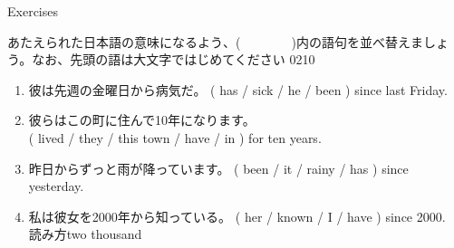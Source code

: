 \documentclass[aspectratio=169,xcolor={dvipsnames,table}]{beamer}
\newcommand{\myaudio}[1]{\href{#1}{\faVolumeUp}}
\begin{document}
\begin{frame}[plain]{Exercises}

{\small あたえられた日本語の意味になるよう、(~~~~~~~~)内の語句を並べ替えましょう。なお、先頭の語は大文字ではじめてください}%
\hfill{\tiny 0210}\,{\scriptsize \myaudio{./audio/012_have_pp_keizoku_06.mp3}}

 \begin{enumerate}
  \item {\small 彼は先週の金曜日から病気だ。}
( has / sick /  he / been ) since last  Friday.\\
  \item 
{\small 彼らはこの町に住んで10年になります。}\\
( lived / they / this town / have / in ) for ten years.\\
  \item 
{\small 昨日からずっと雨が降っています。}
( been / it / rainy / has ) since yesterday.\\
  \item 
{\small 私は彼女を2000年から知っている}。
( her / known / I / have ) since 2000.\\
\hfill{\scriptsize 読み方two thousand }
 \end{enumerate}
\end{frame}
\end{document}
